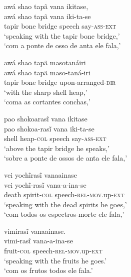 \documentclass[output=paper,
modfonts,nonflat
]{langsci/langscibook}
\begin{document}
\newpage 
\ea awá shao tapã vana ikitase, \\[.3em]
\gll awá   shao tapã   vana   iki-ta-se            \\
     tapir bone bridge speech say-\textsc{ass-ext} \\
\glt `speaking with the tapir bone bridge,' \\
`com a ponte de osso de anta ele fala,'\\
\z

\ea awá shao tapã masotanáiri \\[.3em]
\gll awá   shao tapã   maso-taná-iri              \\
     tapir bone bridge upon-arranged-\textsc{dir} \\
\glt `with the sharp shell heap,' \\
\glt `coma as cortantes conchas,' \\
\z

\ea pao shokoarasĩ vana ikitase \\[.3em]
\gll pao   shokoa-rasĩ       vana   iki-ta-se            \\
     shell heap-\textsc{col} speech say-\textsc{ass-ext} \\
\glt `above the tapir bridge he speaks,'\footnotemark \\
\glt `sobre a ponte de ossos de anta ele fala,' \\
\z


\ea vei yochĩrasĩ vanaainase \\[.3em]
\gll vei   yochĩ-rasĩ          vana-a-ina-se                           \\
     death spirit-\textsc{col} speech-\textsc{rel-mov}.up-\textsc{ext} \\
\glt `speaking with the dead spirits he goes,' \\
`com todos os espectros-morte ele fala,' \\
\z

\ea vimirasĩ vanaainase. \\[.3em]
\gll vimi-rasĩ          vana-a-ina-se                           \\
     fruit-\textsc{col} speech-\textsc{rel-mov}.up-\textsc{ext} \\
\glt `speaking with the fruits he goes.'\footnotemark \\
`com os frutos todos ele fala.'\\
\z
\end{document}
